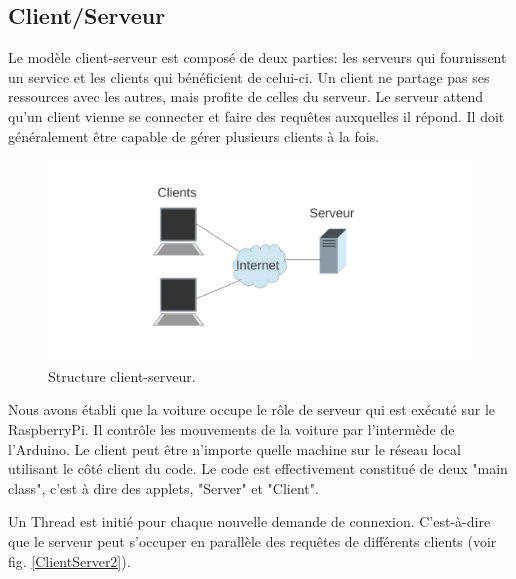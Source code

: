 \documentclass[a4paper,11pt]{report}
\begin{document}
{\begin{enumerate}
\begin{enumerate}
\section{Client/Serveur\label{ClientServeur}}


Le modèle client-serveur est composé de deux parties: les serveurs qui fournissent un service et les clients qui bénéficient de celui-ci. Un client ne partage pas ses ressources avec les autres, mais profite de celles du serveur. Le serveur attend qu'un client vienne se connecter et faire des requêtes auxquelles il répond. Il doit généralement être capable de gérer plusieurs clients à la fois.

\begin{figure}[h]
\includegraphics[width=1.0\textwidth]{Client_Server1.pdf}
\caption[Structure client-serveur]{\label{ClientServer1}Structure client-serveur.}
\end{figure}

Nous avons établi que la voiture occupe le rôle de serveur qui est exécuté sur le RaspberryPi. Il contrôle les mouvements de la voiture par l'intermède de l'Arduino. Le client peut être n'importe quelle machine sur le réseau local utilisant le côté client du code. Le code est effectivement constitué de deux "main class", c'est à dire des applets, "Server" et "Client".  

Un Thread est initié pour chaque nouvelle demande de connexion. C'est-à-dire que le serveur peut s'occuper en parallèle des requêtes de différents clients (voir fig. \ref{ClientServer2}). 


\end{enumerate}
\end{enumerate}}
\end{document}
